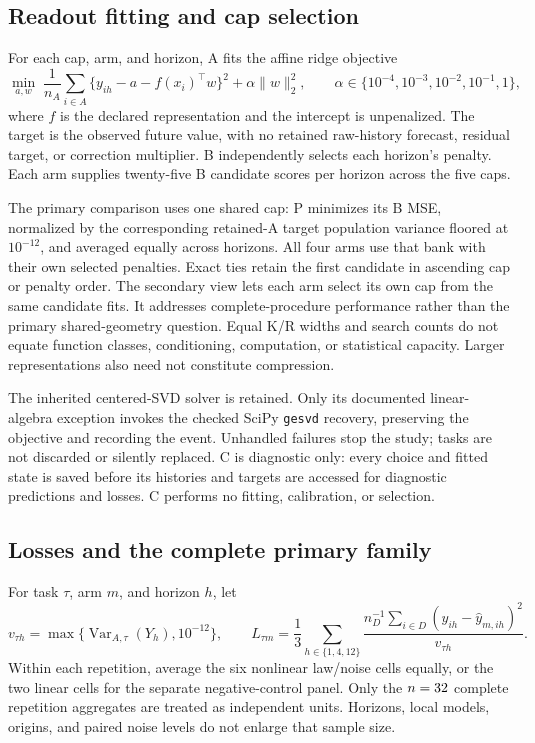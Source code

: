 \subsection{Readout fitting and cap selection}

For each cap, arm, and horizon, A fits the affine ridge objective
\[
 \min_{a,w}\;\frac1{n_A}\sum_{i\in A}
       \{y_{ih}-a-f(x_i)^\top w\}^2+\alpha\|w\|_2^2,
 \qquad \alpha\in\{10^{-4},10^{-3},10^{-2},10^{-1},1\},
\]
where $f$ is the declared representation and the intercept is unpenalized.
The target is the observed future value, with no retained raw-history
forecast, residual target, or correction multiplier. B independently
selects each horizon's penalty. Each arm supplies twenty-five B
candidate scores per horizon across the five caps.

The primary comparison uses one shared cap: P minimizes its B MSE,
normalized by the corresponding retained-A target population variance
floored at $10^{-12}$, and averaged equally across horizons. All four
arms use that bank with their own selected penalties. Exact ties retain
the first candidate in ascending cap or penalty order. The secondary
view lets each arm select its own cap from the same candidate fits.
It addresses complete-procedure performance rather than the primary
shared-geometry question. Equal K/R widths and search counts do not
equate function classes, conditioning, computation, or statistical
capacity. Larger representations also need not constitute compression.

The inherited centered-SVD solver is retained. Only its documented
linear-algebra exception invokes the checked SciPy \texttt{gesvd}
recovery, preserving the objective and recording the event. Unhandled
failures stop the study; tasks are not discarded or silently replaced.
C is diagnostic only: every choice and fitted state is saved before
its histories and targets are accessed for diagnostic predictions and
losses. C performs no fitting, calibration, or selection.

\subsection{Losses and the complete primary family}

For task $\tau$, arm $m$, and horizon $h$, let
\[
 v_{\tau h}=\max\{\operatorname{Var}_{A,\tau}(Y_h),10^{-12}\},
 \qquad
 L_{\tau m}=\frac13\sum_{h\in\{1,4,12\}}
 \frac{n_D^{-1}\sum_{i\in D}(y_{ih}-\widehat y_{m,ih})^2}{v_{\tau h}}.
\]
Within each repetition, average the six nonlinear law/noise cells
equally, or the two linear cells for the separate negative-control panel.
Only the $n=32$ complete repetition aggregates are treated
as independent units. Horizons, local models, origins, and paired noise
levels do not enlarge that sample size.


